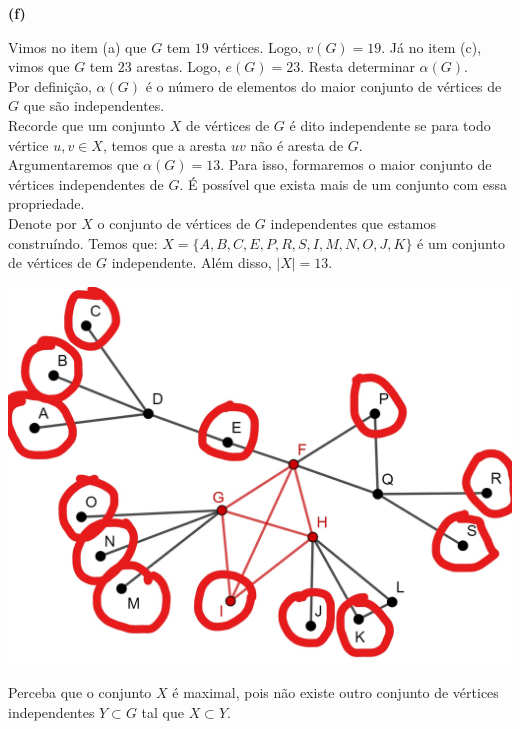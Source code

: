 \documentclass[12pt, a4paper]{article}
\begin{document}
\textbf{(f)}

Vimos no item (a) que \(G\) tem \(19\) vértices. Logo, \(v(G) = 19\). Já no item (c), vimos que \(G\) tem \(23\) arestas. Logo, \(e(G) = 23\). Resta determinar \(\alpha(G)\). \\

Por definição, \(\alpha(G)\) é o número de elementos do maior conjunto de vértices de \(G\) que são independentes. \\

Recorde que um conjunto \(X\) de vértices de \(G\) é dito independente se para todo vértice \(u, v \in X\), temos que a aresta \(uv\) não é aresta de \(G\).  \\

Argumentaremos que \(\alpha(G)=13\). Para isso, formaremos o maior conjunto de vértices independentes de \(G\). É possível que exista mais de um conjunto com essa propriedade.  \\

Denote por \(X\) o conjunto de vértices de \(G\) independentes que estamos construíndo. Temos que: \(X = \{A, B, C, E, P, R, S, I,  M, N, O, J, K\}\) é um conjunto de vértices de \(G\) independente. Além disso, \(|X| = 13\).  

\begin{center}
\includegraphics[scale=0.2]{Inkedgrafo.jpg}
\end{center} 

Perceba que o conjunto \(X\) é maximal, pois não existe outro conjunto de vértices independentes \(Y \subset G\) tal que \(X \subset Y\). \\
\end{document}
